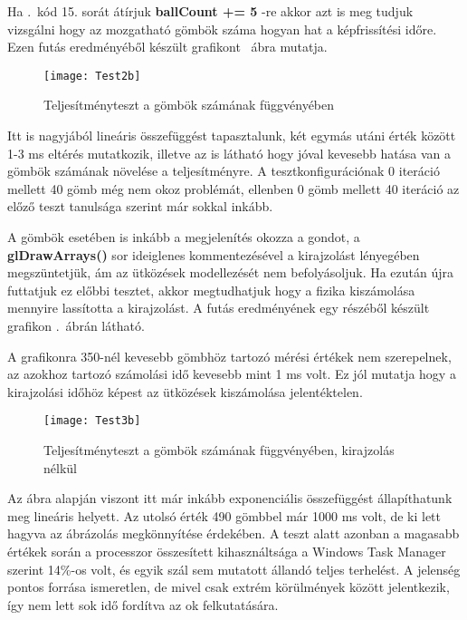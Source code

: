 Ha .~kód 15. sorát átírjuk \textbf{ballCount += 5} -re akkor azt is meg tudjuk vizsgálni hogy az mozgatható gömbök száma hogyan hat a képfrissítési időre. Ezen futás eredményéből készült grafikont ~ábra mutatja.

\begin{figure}[H]
	\centering
	\texttt{[image: Test2b]}
	\caption{Teljesítményteszt a gömbök számának függvényében}
	\label{fig:Test2}
\end{figure}

Itt is nagyjából lineáris összefüggést tapasztalunk, két egymás utáni érték között 1-3 ms eltérés mutatkozik, illetve az is látható hogy jóval kevesebb hatása van a gömbök számának növelése a teljesítményre. A tesztkonfigurációnak 0 iteráció mellett 40 gömb még nem okoz problémát, ellenben 0 gömb mellett 40 iteráció az előző teszt tanulsága szerint már sokkal inkább.

A gömbök esetében is inkább a megjelenítés okozza a gondot, a \textbf{glDrawArrays()} sor ideiglenes kommentezésével a kirajzolást lényegében megszüntetjük, ám az ütközések modellezését nem befolyásoljuk. Ha ezután újra futtatjuk ez előbbi tesztet, akkor megtudhatjuk hogy a fizika kiszámolása mennyire lassította a kirajzolást. A futás eredményének egy részéből készült grafikon .~ábrán látható. 

A grafikonra 350-nél kevesebb gömbhöz tartozó mérési értékek nem szerepelnek, az azokhoz tartozó számolási idő kevesebb mint 1 ms volt. Ez jól mutatja hogy a kirajzolási időhöz képest az ütközések kiszámolása jelentéktelen.

\begin{figure}[H]
	\centering
	\texttt{[image: Test3b]}
	\caption{Teljesítményteszt a gömbök számának függvényében, kirajzolás nélkül}
	\label{fig:Test3}
\end{figure}

Az ábra alapján viszont itt már inkább exponenciális összefüggést állapíthatunk meg lineáris helyett. Az utolsó érték 490 gömbbel már 1000 ms volt, de ki lett hagyva az ábrázolás megkönnyítése érdekében. A teszt alatt azonban a magasabb értékek során a processzor összesített kihasználtsága a Windows Task Manager szerint 14\%-os volt, és egyik szál sem mutatott állandó teljes terhelést.  A jelenség pontos forrása ismeretlen, de mivel csak extrém körülmények között jelentkezik, így nem lett sok idő fordítva az ok felkutatására.
